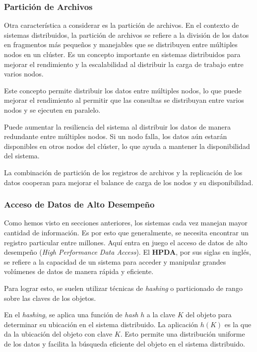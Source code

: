 \documentclass[pdflatex,sn-mathphys-num]{sn-jnl}
\theoremstyle{thmstyleone}%
\theoremstyle{thmstyletwo}%
\theoremstyle{thmstylethree}%
\begin{document}
\subsubsection{Partición de Archivos}\label{sec322}

Otra característica a considerar es la partición de archivos. En el contexto de sistemas distribuidos, la partición de archivos se refiere a la división de los datos en fragmentos más pequeños y manejables que se distribuyen entre múltiples nodos en un clúster. Es un concepto importante en sistemas distribuidos para mejorar el rendimiento y la escalabilidad al distribuir la carga de trabajo entre varios nodos.

Este concepto permite distribuir los datos entre múltiples nodos, lo que puede mejorar el rendimiento al permitir que las consultas se distribuyan entre varios nodos y se ejecuten en paralelo.

Puede aumentar la resiliencia del sistema al distribuir los datos de manera redundante entre múltiples nodos. Si un nodo falla, los datos aún estarán disponibles en otros nodos del clúster, lo que ayuda a mantener la disponibilidad del sistema.

La combinación de partición de los registros de archivos y la replicación de los datos cooperan para mejorar el balance de carga de los nodos y su disponibilidad.

\subsubsection{Acceso de Datos de Alto Desempeño}\label{sec323}

Como hemos visto en secciones anteriores, los sistemas cada vez manejan mayor cantidad de información. Es por esto que generalmente, se necesita encontrar un registro particular entre millones. Aquí entra en juego el acceso de datos de alto desempeño (\textit{High Performance Data Access}). El \textbf{HPDA}, por sus siglas en inglés, se refiere a la capacidad de un sistema para acceder y manipular grandes volúmenes de datos de manera rápida y eficiente.

Para lograr esto, se suelen utilizar técnicas de \textit{hashing} o particionado de rango sobre las claves de los objetos.

En el \textit{hashing}, se aplica una función de \textit{hash} $h$ a la clave $K$ del objeto para determinar su ubicación en el sistema distribuido. La aplicación $h(K)$ es la que da la ubicación del objeto con clave $K$. Esto permite una distribución uniforme de los datos y facilita la búsqueda eficiente del objeto en el sistema distribuido.
\end{document}
